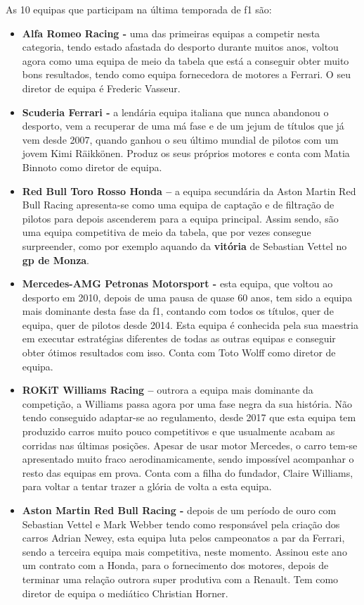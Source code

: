 \documentclass{report}
\begin{document}
As 10 equipas que participam na última temporada de \ac{f1} são: \cite{formula1}
\begin{itemize}
    \item \textbf{Alfa Romeo Racing -}  uma das primeiras equipas a competir nesta categoria, tendo estado afastada do desporto durante muitos anos, voltou agora como uma equipa de meio da tabela que está a conseguir obter muito bons resultados, tendo como equipa fornecedora de motores a Ferrari. O seu diretor de equipa é Frederic Vasseur.
    \item \textbf{Scuderia Ferrari -}  a lendária equipa italiana que nunca abandonou o desporto, vem a recuperar de uma má fase e de um jejum de títulos que já vem desde 2007, quando ganhou o seu último mundial de pilotos com um jovem Kimi Räikkönen. Produz os seus próprios motores e conta com Matia Binnoto como diretor de equipa.
    \item \textbf{Red Bull Toro Rosso Honda –} a equipa secundária da Aston Martin Red Bull Racing apresenta-se como uma equipa de captação e de filtração de pilotos para depois ascenderem para a equipa principal. Assim sendo, são uma equipa competitiva de meio da tabela, que por vezes consegue surpreender, como por exemplo aquando da \textbf{vitória} de Sebastian Vettel no \textbf{\ac{gp} de Monza}.
    \item \textbf{Mercedes-AMG Petronas Motorsport -} esta equipa, que voltou ao desporto em 2010, depois de uma pausa de quase 60 anos, tem sido a equipa mais dominante desta fase da \ac{f1}, contando com todos os títulos, quer de equipa, quer de pilotos desde 2014. Esta equipa é conhecida pela sua maestria em executar estratégias diferentes de todas as outras equipas e conseguir obter ótimos resultados com isso. Conta com Toto Wolff como diretor de equipa.
    \item \textbf{ROKiT Williams Racing –} outrora a equipa mais dominante da competição, a Williams passa agora por uma fase negra da sua história. Não tendo conseguido adaptar-se ao regulamento, desde 2017 que esta equipa tem produzido carros muito pouco competitivos e que usualmente acabam as corridas nas últimas posições. Apesar de usar motor Mercedes, o carro tem-se apresentado muito fraco aerodinamicamente, sendo impossível acompanhar o resto das equipas em prova. Conta com a filha do fundador, Claire Williams, para voltar a tentar trazer a glória de volta a esta equipa.
    \item \textbf{Aston Martin Red Bull Racing -} depois de um período de ouro com Sebastian Vettel e Mark Webber tendo como responsável pela criação dos carros Adrian Newey, esta equipa luta pelos campeonatos a par da Ferrari, sendo a terceira equipa mais competitiva, neste momento. Assinou este ano um contrato com a Honda, para o fornecimento dos motores, depois de terminar uma relação outrora super produtiva com a Renault. Tem como diretor de equipa o mediático Christian Horner.

\end{itemize}
\end{document}
